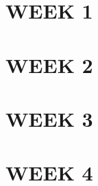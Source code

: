 \documentclass[12pt]{report}
\begin{document}
\section{WEEK 1}
\section{WEEK 2}
\section{WEEK 3}
\section{WEEK 4}






\end{document}

